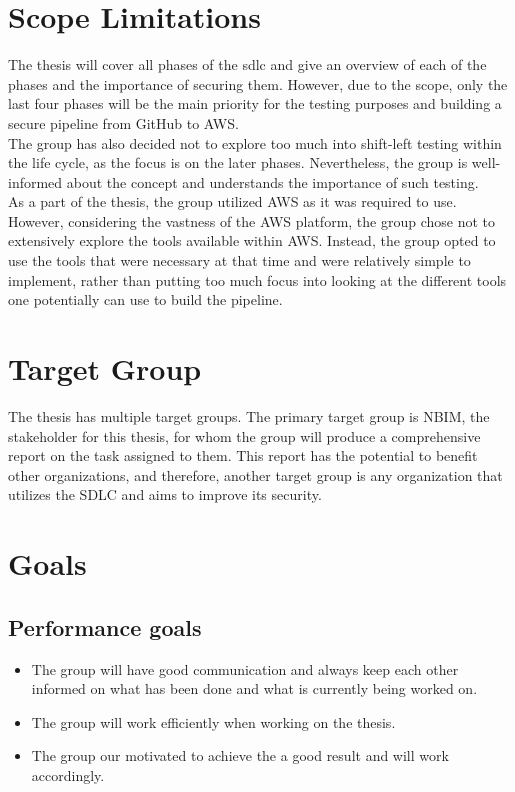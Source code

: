  
\section{Scope Limitations}
The thesis will cover all phases of the \acrlong{sdlc} and give an overview of each of the phases and the importance of securing them.  However, due to the scope, only the last four phases will be the main priority for the testing purposes and building a secure pipeline from GitHub to AWS.
\\
The group has also decided not to explore too much into \gls{shift-left} testing within the life cycle, as the focus is on the later phases. Nevertheless, the group is well-informed about the concept and understands the importance of such testing. 
\\
As a part of the thesis, the group utilized AWS as it was required to use. However, considering the vastness of the AWS platform, the group chose not to extensively explore the tools available within AWS. Instead, the group opted to use the tools that were necessary at that time and were relatively simple to implement, rather than putting too much focus into looking at the different tools one potentially can use to build the pipeline.

\section{Target Group}
The thesis has multiple target groups. The primary target group is NBIM, the stakeholder for this thesis, for whom the group will produce a comprehensive report on the task assigned to them. This report has the potential to benefit other organizations, and therefore, another target group is any organization that utilizes the SDLC and aims to improve its security.
\newpage
\section{Goals}
\subsection{Performance goals}
\begin{itemize}
    \item The group will have good communication and always keep each other informed on what has been done and what is currently being worked on. 
    \item The group will work efficiently when working on the thesis. 
    \item The group our motivated to achieve the a good result and will work accordingly. 
\end{itemize}

